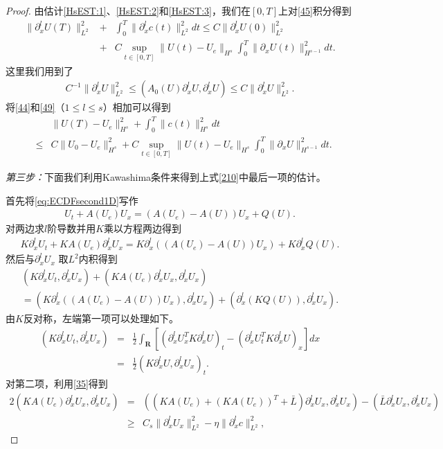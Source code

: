 \begin{proof}
由估计\eqref{HsEST:1}、\eqref{HsEST:2}和\eqref{HsEST:3}，我们在$[0,T]$上对\eqref{45}积分得到
\begin{eqnarray}\label{49}
  \|\partial^l_x U(T)\|_{L^2}^2&  + & \int_0^T \|\partial^l_x c(t)\|^2_{L^2}dt \le C\|\partial^l_x U(0)\|_{L^2}^2  \nonumber\\[3mm]
 & +& C\sup_{t \in [0,T]}\|U(t)-U_e\|_{H^s} \int_0^T \|\partial_x U(t)\|^2_{H^{s-1}}dt .
\end{eqnarray}
这里我们用到了
\begin{eqnarray*}
   C^{-1} \|\partial^l_x U\|_{L^2}^2 \le  (A_0(U) \partial^l_x U,\partial^l_x U) \le C \|\partial^l_x U\|_{L^2}^2.
\end{eqnarray*}
将\eqref{44}和\eqref{49}（$1 \le l \le s$）相加可以得到
  \begin{eqnarray}\label{210}
    && \|U(T)-U_e\|^2_{H^{s}}  +  \int_0^T \|c(t)\|^2_{H^s} dt \nonumber \\
    & \le & C \|U_0-U_e\|_{H^{s}}^2 + C \sup_{t \in [0,T]} \|U(t) - U_e\|_{H^s} \int_0^T \|\partial_x U\|_{H^{s-1}}^2dt.
\end{eqnarray}

\emph{第三步：}下面我们利用Kawashima条件来得到上式\eqref{210}中最后一项的估计。

首先将\eqref{eq:ECDFsecond1D}写作
\begin{eqnarray*}
  U_t + A(U_e) U_x  = (A(U_e) -A(U))U_x + Q(U).
\end{eqnarray*}
对两边求$l$阶导数并用$K$乘以方程两边得到
\begin{eqnarray*}
  K \partial^l_x U_t + K A(U_e) \partial^l_x U_x  = K \partial^l_x ((A(U_e)-A(U))U_x) + K\partial^l_x Q(U).
\end{eqnarray*}
然后与$\partial^l_x U_x$ 取$L^2$内积得到
\begin{eqnarray}\label{211}
  (K \partial^l_x U_t, \partial^l_x U_x) + (KA(U_e) \partial^l_x U_x, \partial^l_x U_x) \nonumber \\ = (K \partial^l_x((A(U_e)-A(U))U_x),\partial^l_x U_x) + (\partial^l_x( K Q(U) ),\partial^l_x U_x).
\end{eqnarray}
由$K$反对称，左端第一项可以处理如下。
\begin{eqnarray}\label{212}
  (K\partial^l_x U_t, \partial^l_x U_x) &=& \frac{1}{2} \int_\mathbf{R} \left[(\partial^l_x U^T_x K \partial^l_x U )_t -  (\partial^l_x U_t^T K\partial^l_x U  )_x \right]dx  \nonumber \\
  &=& \frac{1}{2}(K \partial^l_x U,\partial^l_x U_x)_t .
\end{eqnarray}
对第二项，利用\eqref{35}得到
\begin{eqnarray}\label{213}
  2(KA(U_e) \partial^l_x U_x,\partial^l_x U_x) &=& ( (KA(U_e)+ (K A(U_e))^T +\bar{L}) \partial^l_x U_x, \partial^l_x U_x) - (\bar{L}\partial^l_x U_x, \partial^l_x U_x) \nonumber\\
  &\ge& C_s \|\partial^l_x U_x \|^2_{L^2} -\eta \|\partial^l_x c\|^2_{L^2},
\end{eqnarray}


\end{proof}
